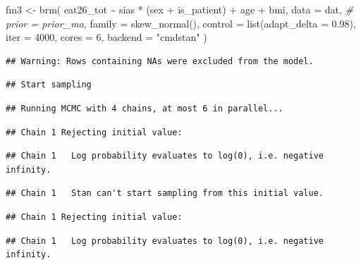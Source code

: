 \documentclass[
]{article}
\newenvironment{Shaded}{\begin{snugshade}}{\end{snugshade}}
\newcommand{\AttributeTok}[1]{\textcolor[rgb]{0.77,0.63,0.00}{#1}}
\newcommand{\CommentTok}[1]{\textcolor[rgb]{0.56,0.35,0.01}{\textit{#1}}}
\newcommand{\DecValTok}[1]{\textcolor[rgb]{0.00,0.00,0.81}{#1}}
\newcommand{\FloatTok}[1]{\textcolor[rgb]{0.00,0.00,0.81}{#1}}
\newcommand{\FunctionTok}[1]{\textcolor[rgb]{0.00,0.00,0.00}{#1}}
\newcommand{\NormalTok}[1]{#1}
\newcommand{\OtherTok}[1]{\textcolor[rgb]{0.56,0.35,0.01}{#1}}
\newcommand{\SpecialCharTok}[1]{\textcolor[rgb]{0.00,0.00,0.00}{#1}}
\newcommand{\StringTok}[1]{\textcolor[rgb]{0.31,0.60,0.02}{#1}}
\begin{document}
\begin{Shaded}
\begin{Highlighting}[]
\NormalTok{fm3 }\OtherTok{\textless{}{-}} \FunctionTok{brm}\NormalTok{(}
\NormalTok{  eat26\_tot }\SpecialCharTok{\textasciitilde{}}\NormalTok{ sias }\SpecialCharTok{*}\NormalTok{ (sex }\SpecialCharTok{+}\NormalTok{ is\_patient) }\SpecialCharTok{+}\NormalTok{ age }\SpecialCharTok{+}\NormalTok{ bmi,}
  \AttributeTok{data =}\NormalTok{ dat, }
  \CommentTok{\# prior = prior\_ma,}
  \AttributeTok{family =} \FunctionTok{skew\_normal}\NormalTok{(),}
  \AttributeTok{control =} \FunctionTok{list}\NormalTok{(}\AttributeTok{adapt\_delta =} \FloatTok{0.98}\NormalTok{),}
  \AttributeTok{iter =} \DecValTok{4000}\NormalTok{,}
  \AttributeTok{cores =} \DecValTok{6}\NormalTok{,}
  \AttributeTok{backend =} \StringTok{"cmdstan"}
\NormalTok{)}
\end{Highlighting}
\end{Shaded}

\begin{verbatim}
## Warning: Rows containing NAs were excluded from the model.
\end{verbatim}

\begin{verbatim}
## Start sampling
\end{verbatim}

\begin{verbatim}
## Running MCMC with 4 chains, at most 6 in parallel...
\end{verbatim}

\begin{verbatim}
## Chain 1 Rejecting initial value:
\end{verbatim}

\begin{verbatim}
## Chain 1   Log probability evaluates to log(0), i.e. negative infinity.
\end{verbatim}

\begin{verbatim}
## Chain 1   Stan can't start sampling from this initial value.
\end{verbatim}

\begin{verbatim}
## Chain 1 Rejecting initial value:
\end{verbatim}

\begin{verbatim}
## Chain 1   Log probability evaluates to log(0), i.e. negative infinity.
\end{verbatim}
\end{document}

